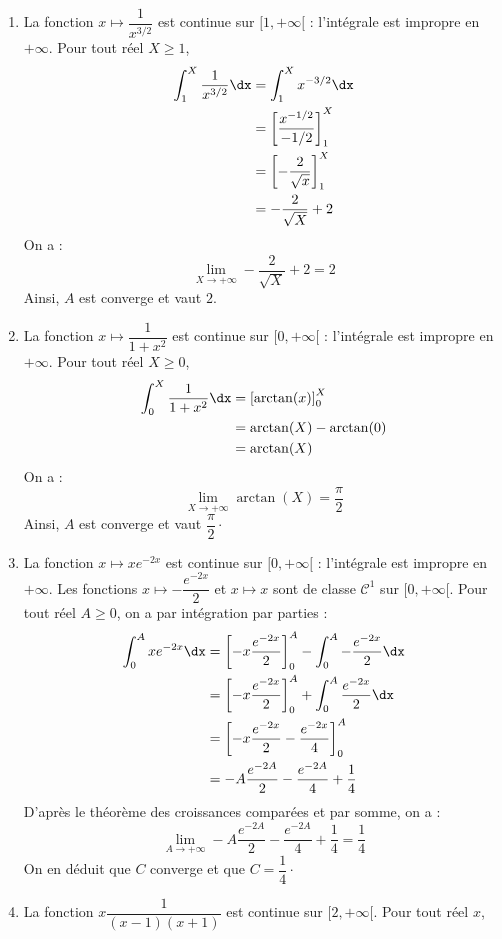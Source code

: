 \documentclass[a4paper,10pt]{report}
\begin{document}
\begin{enumerate}
\item La fonction $x \mapsto  \dfrac{1}{x^{3/2}}$ est continue sur $[1, + \infty[$ : l'intégrale est impropre en $+ \infty$. Pour tout réel $X \geq 1$,
\begin{align*}
\int_1^X \dfrac{1}{x^{3/2}} \dx & = \int_1^X x^{-3/2} \dx  \\
& = \left[ \dfrac{x^{-1/2}}{-1/2} \right]_1^X \\
& = \left[ -\dfrac{2}{\sqrt{x}} \right]_1^X \\
& = - \dfrac{2}{\sqrt{X}} + 2
\end{align*}
On a :
$$ \lim_{X \rightarrow + \infty}  - \dfrac{2}{\sqrt{X}} + 2 = 2$$
Ainsi, $A$ est converge et vaut $2$.
\item La fonction $x \mapsto  \dfrac{1}{1+x^2}$ est continue sur $[0, + \infty[$ : l'intégrale est impropre en $+ \infty$. Pour tout réel $X \geq 0$,
\begin{align*}
\int_0^X \dfrac{1}{1+x^2} \dx & = \left[ \arctan(x) \right]_0^X \\
& =\arctan(X)- \arctan(0)\\
& = \arctan(X)
\end{align*}
On a :
$$ \lim_{X \rightarrow + \infty} \arctan(X) =  \dfrac{\pi}{2}$$
Ainsi, $A$ est converge et vaut $\dfrac{\pi}{2} \cdot$
\item La fonction $x \mapsto x e^{-2x}$ est continue sur $[0, + \infty[$ : l'intégrale est impropre en $+ \infty$. Les fonctions $x \mapsto -\dfrac{e^{-2x}}{2}$ et $x \mapsto x$ sont de classe $\mathcal{C}^1$ sur $[0, + \infty[$. Pour tout réel $A \geq 0$, on a par intégration par parties :
\begin{align*}
 \int_0^{A} x e^{-2x} \dx & = \left[ -x \dfrac{e^{-2x}}{2} \right]_0^A - \int_0^A -\dfrac{e^{-2x}}{2} \dx \\
 & = \left[ -x \dfrac{e^{-2x}}{2} \right]_0^A + \int_0^A \dfrac{e^{-2x}}{2} \dx \\
 & = \left[ -x \dfrac{e^{-2x}}{2} - \dfrac{e^{-2x}}{4}\right]_0^A \\
 & =  -A \dfrac{e^{-2A}}{2} - \dfrac{e^{-2A}}{4} + \dfrac{1}{4}
 \end{align*}
D'après le théorème des croissances comparées et par somme, on a :
$$ \lim_{A \rightarrow + \infty}  -A \dfrac{e^{-2A}}{2} - \dfrac{e^{-2A}}{4} + \dfrac{1}{4} = \dfrac{1}{4}$$
On en déduit que $C$ converge et que $C= \dfrac{1}{4} \cdot$
\item La fonction $x \dfrac{1}{(x-1)(x+1)}$ est continue sur $[2, + \infty[$. Pour tout réel $x$,

\end{enumerate}
\end{document}
